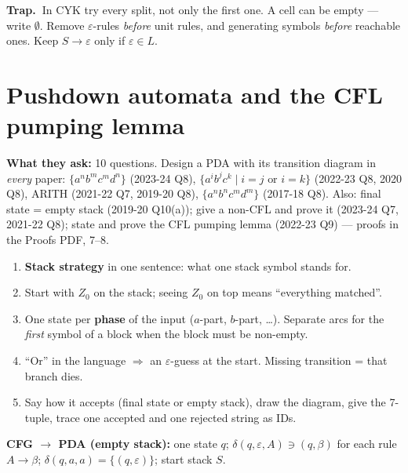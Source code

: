 \documentclass[10.5pt,a4paper]{article}
\newcommand{\TRAP}{\textbf{\color{trapborder}Trap.\ }}
\newcommand{\asked}[1]{{\small\color{gray!60!black}\textbf{What they ask:} #1}\par}
\newcommand{\eps}{\varepsilon}
\begin{document}
\begin{trap}\TRAP In CYK try every split, not only the first one. A cell can be empty --- write $\emptyset$. Remove $\eps$-rules \emph{before}
unit rules, and generating symbols \emph{before} reachable ones. Keep $S\to\eps$ only if $\eps\in L$.\end{trap}

\section{Pushdown automata and the CFL pumping lemma}
\asked{10 questions. Design a PDA with its transition diagram in \emph{every} paper: $\{a^nb^mc^md^n\}$ (2023-24 Q8), $\{a^ib^jc^k\mid i=j\text{ or }
i=k\}$ (2022-23 Q8, 2020 Q8), ARITH (2021-22 Q7, 2019-20 Q8), $\{a^nb^nc^md^m\}$ (2017-18 Q8). Also: final state = empty stack (2019-20 Q10(a));
give a non-CFL and prove it (2023-24 Q7, 2021-22 Q8); state and prove the CFL pumping lemma (2022-23 Q9) --- proofs in the Proofs PDF, 7--8.}
\begin{recipe}[Recipe --- designing a PDA (Atif's notation: $a,X/\gamma$ = read $a$, pop $X$, push $\gamma$, leftmost on top)]
\begin{enumerate}
\item \textbf{Stack strategy} in one sentence: what one stack symbol stands for.
\item Start with $Z_0$ on the stack; seeing $Z_0$ on top means ``everything matched''.
\item One state per \textbf{phase} of the input ($a$-part, $b$-part, \dots). Separate arcs for the \emph{first} symbol of a block when the
block must be non-empty.
\item ``Or'' in the language $\Rightarrow$ an $\eps$-guess at the start. Missing transition = that branch dies.
\item Say how it accepts (final state or empty stack), draw the diagram, give the 7-tuple, trace one accepted and one rejected string as IDs.
\end{enumerate}
\textbf{CFG $\to$ PDA (empty stack):} one state $q$; $\delta(q,\eps,A)\ni(q,\beta)$ for each rule $A\to\beta$; $\delta(q,a,a)=\{(q,\eps)\}$; start stack $S$.
\end{recipe}
\end{document}
